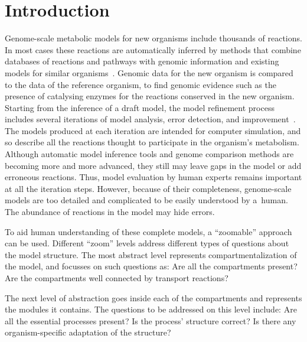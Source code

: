 \documentclass[9pt]{article}
\newcounter{rm}
\begin{document}
\section*{Introduction}
Genome-scale metabolic models for new organisms include thousands of reactions. In most cases these reactions are automatically inferred by methods that combine databases of reactions and pathways with genomic information and existing models for similar organisms~\citep{Swainston2011}. Genomic data for the new organism is compared to the data of the reference organism, to find genomic evidence such as the presence of catalysing enzymes for the reactions conserved in the new organism. Starting from the inference of a draft model, the model refinement process includes several iterations of model analysis, error detection, and improvement~\citep{Thiele2010}. The models produced at each iteration are intended for computer simulation, and so describe all the reactions thought to participate in the organism's metabolism. Although automatic model inference tools and genome comparison methods are becoming more and more advanced, they still may leave gaps in the model or add erroneous reactions. Thus, model evaluation by human experts remains important at all the iteration steps. However, because of their completeness, genome-scale models are too detailed and complicated to be easily understood by a~human. The abundance of reactions in the model may hide errors.


To aid human understanding of these complete models, a ``zoomable'' approach can be used. Different ``zoom'' levels address different types of questions about the model structure. The most abstract level represents compartmentalization of the model, and focusses on such questions as: Are all the compartments present? Are the compartments well connected by transport reactions?

The next level of abstraction goes inside each of the compartments and represents the modules it contains. The questions to be addressed on this level include: Are all the essential processes present? Is the process' structure correct? Is there any organism-specific adaptation of the structure?
\end{document}
